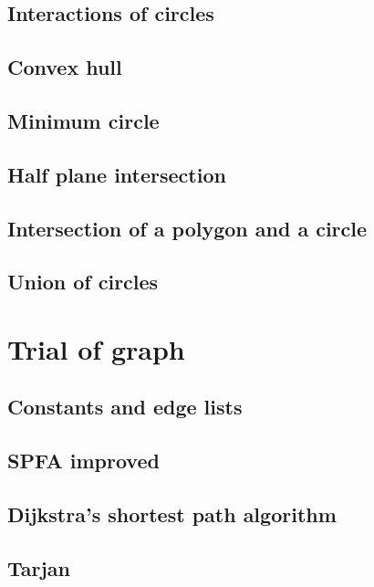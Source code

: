 \documentclass[UTF8,a4paper]{report}
\begin{document}
		\section{Interactions of circles}
			
		\section{Convex hull}
			
		\section{Minimum circle}
			
		\section{Half plane intersection}
			
		\section{Intersection of a polygon and a circle}
			
		\section{Union of circles}	
			
	\chapter{Trial of graph}
		\section{Constants and edge lists}
			
		\section{SPFA improved}
			
		\section{Dijkstra's shortest path algorithm}
			
		\section{Tarjan}
			
\end{document}
